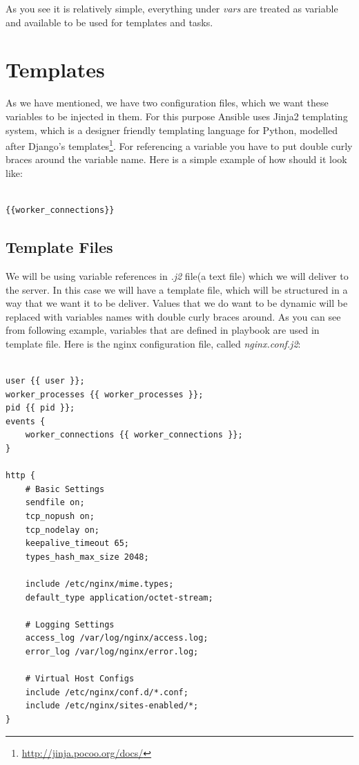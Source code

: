 \documentclass[10pt]{book}
\begin{document}
As you see it is relatively simple, everything under \emph{vars} are treated as 
variable and available to be used for templates and tasks.

\section{Templates}
As we have mentioned, we have two configuration files, which we want these variables to be injected in them.
For this purpose Ansible uses Jinja2 templating system, which is a designer friendly templating language 
for Python, modelled after Django’s templates\footnote { \url{http://jinja.pocoo.org/docs/}}.
For referencing a variable you have to put double curly braces around the variable 
name. Here is a simple example of how should it look like:

\begin{verbatim}

{{worker_connections}} 

\end{verbatim}

\subsection{Template Files}
We will be using variable references in \emph{.j2} file(a text file) which we will deliver to 
the server. In this case we will have a template file, which will be structured 
in a way that we want it to be deliver. Values that we do want to be dynamic will be replaced with 
variables names with double curly braces around. As you can see from following 
example, variables that are defined in playbook are used in template file. 
Here is the nginx configuration file, called \emph{nginx.conf.j2}:

\begin{verbatim}

user {{ user }};
worker_processes {{ worker_processes }};
pid {{ pid }};
events {
    worker_connections {{ worker_connections }};
}

http {
    # Basic Settings
    sendfile on;
    tcp_nopush on;
    tcp_nodelay on;
    keepalive_timeout 65;
    types_hash_max_size 2048;

    include /etc/nginx/mime.types;
    default_type application/octet-stream;

    # Logging Settings
    access_log /var/log/nginx/access.log;
    error_log /var/log/nginx/error.log;

    # Virtual Host Configs
    include /etc/nginx/conf.d/*.conf;
    include /etc/nginx/sites-enabled/*;
}

\end{verbatim}
\end{document}
